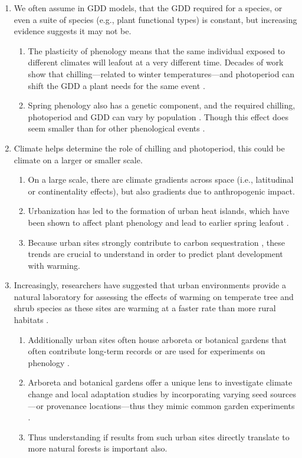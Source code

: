 \documentclass{article}\usepackage[]{graphicx}\usepackage[]{color}
\begin{document}
\begin{enumerate}
\item We often assume in GDD models, that the GDD required for a species, or even a suite of species (e.g., plant functional types) is constant, but increasing evidence suggests it may not be.
  \begin{enumerate} 
  \item The plasticity of phenology means that the same individual exposed to different climates will leafout at a very different time. Decades of work show that chilling---related to winter temperatures---and photoperiod can shift the GDD a plant needs for the same event \citep{Basler2012,Chuine2010,Zohner2016}.
  \item Spring phenology also has a genetic component, and the required chilling, photoperiod and GDD can vary by population \citep{Scotti2004,Cuervo-Alarcon2018}. Though this effect does seem smaller than for other phenological events \citep{McKown2013,Satake2013}.
  \end{enumerate}

\item Climate helps determine the role of chilling and photoperiod, this could be climate on a larger or smaller scale. 
  \begin{enumerate} 
  \item On a large scale, there are climate gradients across space (i.e., latitudinal or continentality effects), but also gradients due to anthropogenic impact. 
  \item Urbanization has led to the formation of urban heat islands, which have been shown to affect plant phenology and lead to earlier spring leafout \citep{Meng2020}. 
  \item Because urban sites strongly contribute to carbon sequestration \citep{Ziter2018}, these trends are crucial to understand in order to predict plant development with warming. 
  \end{enumerate}
  
\item Increasingly, researchers have suggested that urban environments  provide a natural laboratory for assessing the effects of warming on temperate tree and shrub species as these sites are warming at a faster rate than more rural habitats \citep{Pickett2011, Grimm2008}.
  \begin{enumerate}
  \item Additionally urban sites often house arboreta or botanical gardens that often contribute long-term records \citep{Zohner2014} or are used for experiments on phenology \citep{Ettinger2018}.
  \item Arboreta and botanical gardens offer a unique lens to investigate climate change and local adaptation studies by incorporating varying seed sources---or provenance locations---thus they mimic common garden experiments \citep{Primack2009}.   \item Thus understanding if results from such urban sites directly translate to more natural forests is important also. 
  \end{enumerate}
  

\end{enumerate}
\end{document}
